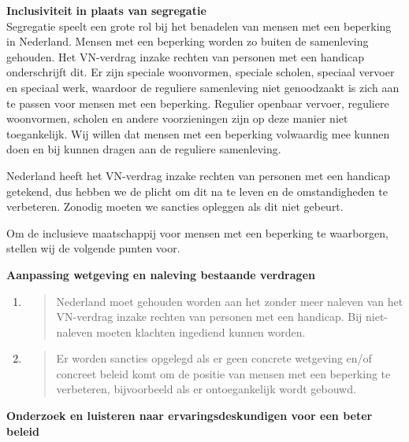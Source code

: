 \textbf{Inclusiviteit} \textbf{in plaats van segregatie}\\
Segregatie speelt een grote rol bij het benadelen van mensen met een
beperking in Nederland. Mensen met een beperking worden zo buiten de
samenleving gehouden. Het VN-verdrag inzake rechten van personen met een
handicap onderschrijft dit. Er zijn speciale woonvormen, speciale
scholen, speciaal vervoer en speciaal werk, waardoor de reguliere
samenleving niet genoodzaakt is zich aan te passen voor mensen met een
beperking. Regulier openbaar vervoer, reguliere woonvormen, scholen en
andere voorzieningen zijn op deze manier niet toegankelijk. Wij willen
dat mensen met een beperking volwaardig mee kunnen doen en bij kunnen
dragen aan de reguliere samenleving.

Nederland heeft het VN-verdrag inzake rechten van personen met een
handicap getekend, dus hebben we de plicht om dit na te leven en de
omstandigheden te verbeteren. Zonodig moeten we sancties opleggen als
dit niet gebeurt.

Om de inclusieve maatschappij voor mensen met een beperking te
waarborgen, stellen wij de volgende punten voor.

\textbf{Aanpassing wetgeving en naleving bestaande verdragen}

\begin{enumerate}
\def\labelenumi{\arabic{enumi}.}
\item
  \begin{quote}
  Nederland moet gehouden worden aan het zonder meer naleven van het
  VN-verdrag inzake rechten van personen met een handicap. Bij
  niet-naleven moeten klachten ingediend kunnen worden.
  \end{quote}
\item
  \begin{quote}
  Er worden sancties opgelegd als er geen concrete wetgeving en/of
  concreet beleid komt om de positie van mensen met een beperking te
  verbeteren, bijvoorbeeld als er ontoegankelijk wordt gebouwd.
  \end{quote}
\end{enumerate}

\textbf{Onderzoek en luisteren naar ervaringsdeskundigen voor een beter
beleid}

